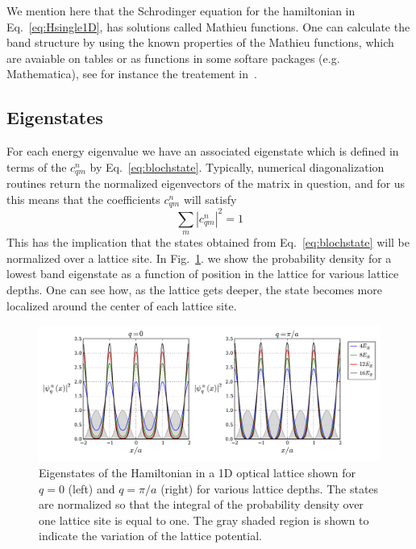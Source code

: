 \documentclass[11pt,letter]{article}
\begin{document}
We mention here that the Schrodinger equation for the hamiltonian in
Eq.~\ref{eq:Hsingle1D}, has solutions called Mathieu functions. 
One can calculate the band structure by using the known properties of the
Mathieu functions, which are avaiable on tables or as functions in some softare
packages (e.g. Mathematica), see for instance the treatement
in~\cite{PhysRev.87.807}. 

\subsection{Eigenstates}
For each energy eigenvalue we have an associated eigenstate  which is defined
in terms of the $c_{qm}^{n}$ by Eq.~\ref{eq:blochstate}.   Typically, numerical
diagonalization routines return the normalized eigenvectors of the matrix in
question,  and for us this means that the coefficients $c_{qm}^{n}$ will
satisfy
\begin{equation}
   \sum_{m} | c_{qm}^{n} |^{2} = 1 
\end{equation} 
This has the implication that the states obtained from Eq.~\ref{eq:blochstate}
will be normalized over a lattice site.  In Fig.~\ref{fig:eigenfuns1d}. we show
the probability density for a lowest band eigenstate as a function of position
in the lattice for various lattice depths.  One can see how, as the lattice
gets deeper, the state becomes more localized around the center of each lattice
site. 
\begin{figure}
\centering \includegraphics[width=\textwidth]{../BandStructure_figures/eigenfuns1d.pdf}
\caption[Eigenstates in 1D lattice.]{\small Eigenstates of the Hamiltonian in a
1D optical lattice shown for $q=0$ (left) and $q=\pi/a$ (right) for various
lattice depths. The states are normalized so that the integral of the
probability density over one lattice site is equal to one.  The gray shaded
region is shown to indicate the variation of the lattice potential. }
\label{fig:eigenfuns1d}
\end{figure}
\end{document}
